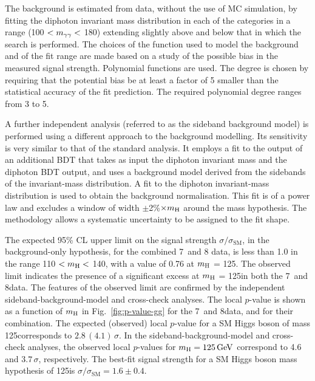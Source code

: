 \documentclass[11pt,twoside,a4paper,cmspaper,final]{cms-tdr}
\begin{document}
\begin{table}[htbp]
\begin{center}
\begin{tabular}
\hline
\end{tabular}

\label{tab:ClassFracs}
\end{center}
\end{table}

The background is estimated from data, without the use of MC
simulation,
by fitting the diphoton invariant mass distribution in each of the categories
in a range (100 $< m_{\gamma\gamma} <$ 180\GeV) extending slightly above and
below that in which the search is performed.
The choices of the function
used to model the background and of the fit range are made based on a study of the possible
bias in the measured signal strength.
Polynomial functions are used.
The degree is chosen by requiring that the potential bias be
at least a factor of 5 smaller
than the statistical accuracy of the fit prediction.
The required polynomial degree ranges from 3 to 5.

A further independent analysis (referred to as the sideband background model) is
performed using a different approach to the background modelling.
Its sensitivity is very similar to that of the standard analysis.
It employs a fit to the output of an additional BDT that
takes as input the diphoton invariant mass and the diphoton BDT output,
and uses a background model
derived from the sidebands of the invariant-mass distribution.
A fit to the diphoton invariant-mass distribution is used to obtain the background normalisation.
This fit is of a power law and excludes a window of width $\pm$2\%$\times m_{\mathrm{H}}$
around the mass hypothesis. The methodology allows a systematic
uncertainty to be assigned to the fit shape.

The expected 95\% CL upper limit on the signal strength
$\sigma/\sigma_\mathrm{SM}$, in the background-only hypothesis,
for the combined 7~and 8\TeV
data, is less than 1.0 in the range
110 $< m_{\mathrm{H}} <$ 140\GeV, with a value of 0.76 at
$m_{\mathrm{H}}$ = 125\GeV.
The observed limit indicates the presence of a significant excess at $m_{\mathrm{H}}$ =
125\GeV in both the 7~and 8\TeV data.
The features of the observed limit are confirmed
by the independent sideband-background-model and cross-check analyses.
The local $p$-value is shown as a function of $m_{\mathrm{H}}$ in
Fig.~\ref{fig:p-value-gg} for the 7~and 8\TeV data,
and for their combination.
The expected (observed) local $p$-value for a SM Higgs boson of mass 125\GeV corresponds to $2.8\,(4.1)\,\sigma.$ In the sideband-background-model and cross-check analyses, the observed local
$p$-values for $m_{\mathrm{H}}=125\,\text{Ge\hspace{-.08em}V}$ correspond to 4.6 and $3.7\,\sigma$, respectively.
The best-fit signal strength for a SM Higgs boson mass hypothesis of
125\GeV is $\sigma/\sigma_\mathrm{SM} = 1.6\pm0.4$.
\end{document}
